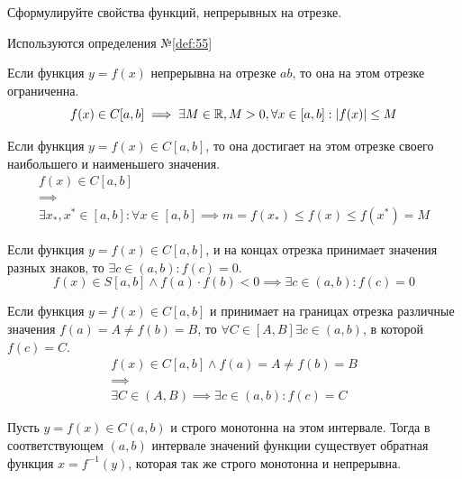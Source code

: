 \begin{question}
    Сформулируйте свойства функций, непрерывных на отрезке.
\end{question}
\begin{used}
    Используются определения №\ref{def:55}
\end{used}
\begin{theorem}
    Если функция $y = f(x)$ непрерывна на отрезке $ab$, то она на этом отрезке ограниченна. \[
        f(x) \in C[a, b] \implies \exists M \in \mathbb{R}, M > 0, \forall x \in [a, b] : |f(x)| \le  M
    \] 
\end{theorem}
\begin{theorem}
    Если функция $y = f(x) \in C[a, b]$, то она достигает на этом отрезке своего наибольшего и наименьшего значения.
    \begin{gather*}
        f(x) \in C[a, b] \\
        \implies \\
        \exists x_*, x^* \in [a, b] : \forall x \in [a, b] \implies m = f(x_*) \le f(x) \le f(x^*) = M
    \end{gather*}
\end{theorem}
\begin{theorem}
    Если функция $y = f(x) \in C[a, b]$, и на концах отрезка принимает значения разных знаков, то $\exists c \in (a, b) : f(c) = 0$. \[
        f(x) \in S[a, b] \land f(a) \cdot f(b) < 0 \implies \exists  c \in (a, b) : f(c) = 0
    \] 
\end{theorem}
\begin{theorem}
    Если функция $y = f(x) \in C[a, b]$ и принимает на границах отрезка различные значения $f(a) = A \neq f(b) = B$, то $\forall C \in [A, B] \exists c \in (a, b)$, в которой $f(c) = C$.
    \begin{gather*}
        f(x) \in C[a, b] \land f(a) = A \neq f(b) = B \\
        \implies \\
        \exists C \in (A, B) \implies \exists c \in (a, b) : f(c) = C
    \end{gather*}
\end{theorem}
\begin{theorem}
    Пусть $y = f(x) \in C(a, b)$ и строго монотонна на этом интервале. Тогда в соответствующем $(a, b)$ интервале значений функции существует обратная функция $x = f^{-1}(y)$, которая так же строго монотонна и непрерывна.
\end{theorem}
\pagebreak
